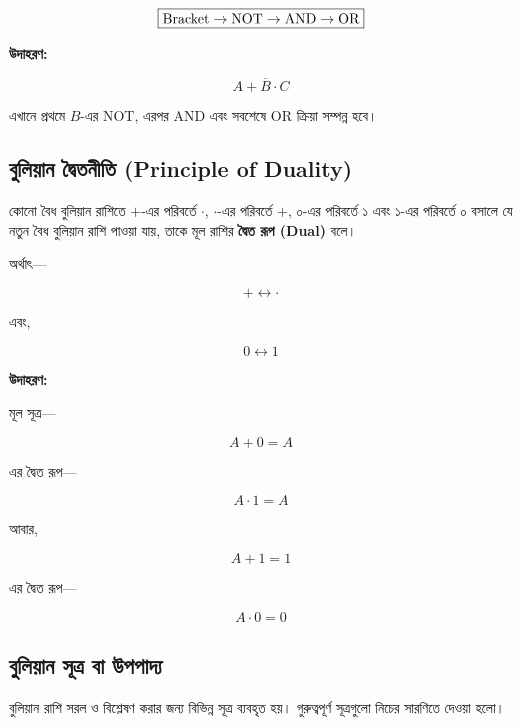 \[
\boxed{
\text{\textenglish{Bracket}}
\rightarrow
\text{\textenglish{NOT}}
\rightarrow
\text{\textenglish{AND}}
\rightarrow
\text{\textenglish{OR}}
}
\]
\par\endgroup


\textbf{\textcolor{ICTOrange}{উদাহরণ:}}

\[
A+\overline{B}\cdot C
\]

এখানে প্রথমে \(B\)-এর \textenglish{NOT},
এরপর \textenglish{AND} এবং সবশেষে
\textenglish{OR} ক্রিয়া সম্পন্ন হবে।


\subsection{বুলিয়ান দ্বৈতনীতি
(\textenglish{Principle of Duality})}

\par\begingroup

কোনো বৈধ বুলিয়ান রাশিতে \(+\)-এর পরিবর্তে \(\cdot\),
\(\cdot\)-এর পরিবর্তে \(+\), ০-এর পরিবর্তে ১ এবং
১-এর পরিবর্তে ০ বসালে যে নতুন বৈধ বুলিয়ান রাশি পাওয়া যায়,
তাকে মূল রাশির \textbf{দ্বৈত রূপ
(\textenglish{Dual})} বলে।
\par\endgroup


অর্থাৎ—

\[
+\leftrightarrow\cdot
\]

এবং,

\[
0\leftrightarrow1
\]

\textbf{\textcolor{ICTOrange}{উদাহরণ:}}

মূল সূত্র—

\[
A+0=A
\]

এর দ্বৈত রূপ—

\[
A\cdot1=A
\]

আবার,

\[
A+1=1
\]

এর দ্বৈত রূপ—

\[
A\cdot0=0
\]


\subsection{বুলিয়ান সূত্র বা উপপাদ্য}

বুলিয়ান রাশি সরল ও বিশ্লেষণ করার জন্য বিভিন্ন সূত্র ব্যবহৃত হয়।
গুরুত্বপূর্ণ সূত্রগুলো নিচের সারণিতে দেওয়া হলো।

